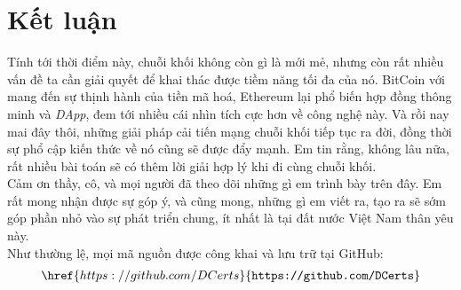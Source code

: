 \chapter*{Kết luận}

Tính tới thời điểm này, chuỗi khối không còn gì là mới mẻ, nhưng còn rất nhiều vấn đề ta cần giải quyết để khai thác được tiềm năng tối đa của nó. BitCoin với mang đến sự thịnh hành của tiền mã hoá, Ethereum lại phổ biến hợp đồng thông minh và \textit{DApp}, đem tới nhiều cái nhìn tích cực hơn về công nghệ này. Và rồi nay mai đây thôi, những giải pháp cải tiến mạng chuỗi khối tiếp tục ra đời, đồng thời sự phổ cập kiến thức về nó cũng sẽ được đẩy mạnh. Em tin rằng, không lâu nữa, rất nhiều bài toán sẽ có thêm lời giải hợp lý khi đi cùng chuỗi khối.\\

Cảm ơn thầy, cô, và mọi người đã theo dõi những gì em trình bày trên đây. Em rất mong nhận được sự góp ý, và cũng mong, những gì em viết ra, tạo ra sẽ sớm góp phần nhỏ vào sự phát triển chung, ít nhất là tại đất nước Việt Nam thân yêu này.\\

Như thường lệ, mọi mã nguồn được công khai và lưu trữ tại GitHub:
\begin{align*}
    \href{https://github.com/DCerts}{\texttt{https://github.com/DCerts}}
\end{align*}